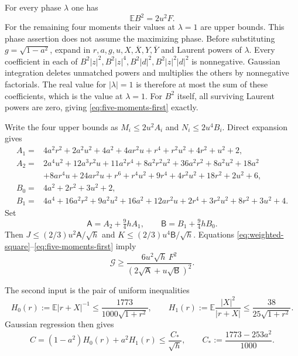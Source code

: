 For every phase $\lambda$ one has
\begin{equation}
 \mathbb EB^2=2u^2F.
 \label{eq:five-moments-first}
\end{equation}
For the remaining four moments their values at $\lambda=1$ are upper bounds.
This phase assertion does not assume the maximizing phase.  Before
substituting $g=\sqrt{1-a^2}$, expand in
$r,a,g,u,X,\overline X,Y,\overline Y$ and Laurent powers of $\lambda$.
Every coefficient in each of
$B^2|z|^2,B^2|z|^4,B^2|d|^2,B^2|z|^2|d|^2$ is nonnegative.
Gaussian integration deletes unmatched powers and multiplies the others by
nonnegative factorials.  The real value for $|\lambda|=1$ is therefore at
most the sum of these coefficients, which is the value at $\lambda=1$.
For $B^2$ itself, all surviving Laurent powers are zero, giving
\eqref{eq:five-moments-first} exactly.

Write the four upper bounds as
$M_i\le2u^2A_i$ and $N_i\le2u^4B_i$.  Direct expansion gives
\begin{align*}
 A_1={}&4a^2r^2+2a^2u^2+4a^2+4ar^2u
         +r^4+r^2u^2+4r^2+u^2+2,\\
 A_2={}&2a^4u^2+12a^3r^2u+11a^2r^4+8a^2r^2u^2
          +36a^2r^2+8a^2u^2+18a^2\\
       &+8ar^4u+24ar^2u+r^6+r^4u^2+9r^4+4r^2u^2
          +18r^2+2u^2+6,\\
 B_0={}&4a^2+2r^2+3u^2+2,\\
 B_1={}&4a^4+16a^2r^2+9a^2u^2+16a^2+12ar^2u
          +2r^4+3r^2u^2+8r^2+3u^2+4.
\end{align*}
Set
\[
 \mathsf A=A_2+\tfrac94hA_1,\qquad
 \mathsf B=B_1+\tfrac94hB_0.
\]
Then $J\le (2/3)u^2\mathsf A/\sqrt h$ and
$K\le (2/3)u^4\mathsf B/\sqrt h$.
Equations \eqref{eq:weighted-square}--\eqref{eq:five-moments-first} imply
\begin{equation}
 \mathcal G\ge
 \frac{6u^2\sqrt h\,F^2}{(2\sqrt{\mathsf A}+u\sqrt{\mathsf B})^2}.
 \label{eq:gap-rational}
\end{equation}

The second input is the pair of uniform inequalities
\begin{equation}
 H_0(r):=\mathbb E|r+X|^{-1}\le\frac{1773}{1000\sqrt{1+r^2}},
 \qquad
 H_1(r):=\mathbb E\frac{|X|^2}{|r+X|}
       \le\frac{38}{25\sqrt{1+r^2}}.
 \label{eq:normalized-inverse-radius}
\end{equation}
Gaussian regression then gives
\begin{equation}
 C=(1-a^2)H_0(r)+a^2H_1(r)
   \le\frac{C_*}{\sqrt h},\qquad
 C_*:=\frac{1773-253a^2}{1000}.
 \label{eq:C-regression}
\end{equation}

